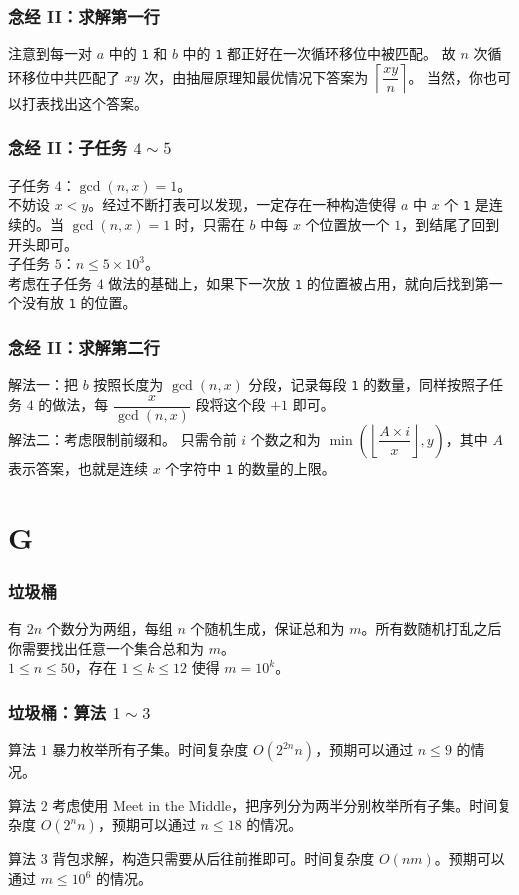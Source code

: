 \documentclass{beamer}
\begin{document}
\begin{frame}
\frametitle{念经 II：求解第一行}
注意到每一对 $a$ 中的 \texttt{1} 和 $b$ 中的 \texttt{1} 都正好在一次循环移位中被匹配。
\pause
故 $n$ 次循环移位中共匹配了 $xy$ 次，由抽屉原理知最优情况下答案为 $\left\lceil \dfrac{xy}{n} \right\rceil$。
\pause
当然，你也可以打表找出这个答案。
\end{frame}

\begin{frame}
\frametitle{念经 II：子任务 $4 \sim 5$}
子任务 $4$：$\gcd(n,x) = 1$。\\
\pause
不妨设 $x < y$。经过不断打表可以发现，一定存在一种构造使得 $a$ 中 $x$ 个 \texttt{1} 是连续的。当 $\gcd(n,x) = 1$ 时，只需在 $b$ 中每 $x$ 个位置放一个 $1$，到结尾了回到开头即可。\\
\pause
子任务 $5$：$n \leq 5 \times 10^3$。\\
\pause
考虑在子任务 $4$ 做法的基础上，如果下一次放 \texttt{1} 的位置被占用，就向后找到第一个没有放 \texttt{1} 的位置。
\end{frame}

\begin{frame}
\frametitle{念经 II：求解第二行}
解法一：把 $b$ 按照长度为 $\gcd(n,x)$ 分段，记录每段 \texttt{1} 的数量，同样按照子任务 $4$ 的做法，每 $\dfrac{x}{\gcd(n,x)}$ 段将这个段 $+1$ 即可。\\
\pause
解法二：考虑限制前缀和。
\pause
只需令前 $i$ 个数之和为 $\min\left(\left\lfloor\dfrac{A \times i}{x}\right\rfloor, y\right)$，其中 $A$ 表示答案，也就是连续 $x$ 个字符中 \texttt{1} 的数量的上限。
\end{frame}

\section{G}

\begin{frame}
\frametitle{垃圾桶}
有 $2n$ 个数分为两组，每组 $n$ 个随机生成，保证总和为 $m$。所有数随机打乱之后你需要找出任意一个集合总和为 $m$。\\
$1 \leq n \leq 50$，存在 $1 \leq k \leq 12$ 使得 $m = 10^k$。
\end{frame}

\begin{frame}
\frametitle{垃圾桶：算法 $1 \sim 3$}
\begin{block}{算法 $1$}
暴力枚举所有子集。时间复杂度 $O(2^{2n} n)$，预期可以通过 $n \leq 9$ 的情况。
\end{block}
\pause
\begin{block}{算法 $2$}
考虑使用 Meet in the Middle，把序列分为两半分别枚举所有子集。时间复杂度 $O(2^n n)$，预期可以通过 $n \leq 18$ 的情况。
\end{block}
\pause
\begin{block}{算法 $3$}
背包求解，构造只需要从后往前推即可。时间复杂度 $O(nm)$。预期可以通过 $m \leq 10^6$ 的情况。
\end{block}
\end{frame}
\end{document}

